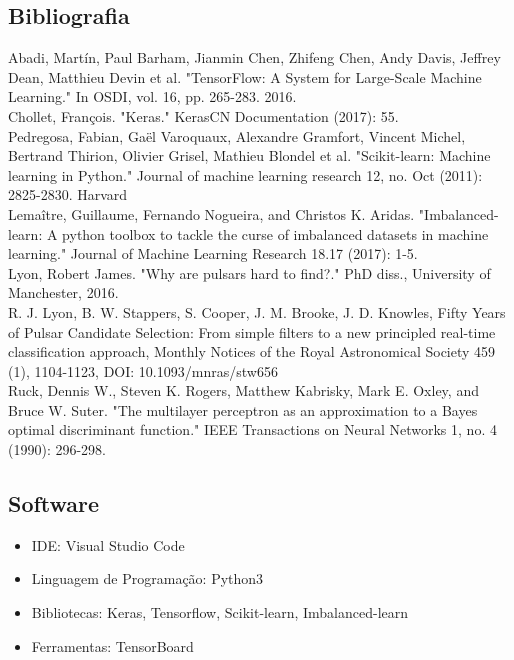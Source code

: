 \documentclass[]{article}
\begin{document}
\subsection{Bibliografia}

Abadi, Martín, Paul Barham, Jianmin Chen, Zhifeng Chen, Andy Davis, Jeffrey Dean, Matthieu Devin et al. "TensorFlow: A System for Large-Scale Machine Learning." In OSDI, vol. 16, pp. 265-283. 2016.
\\

Chollet, François. "Keras." KerasCN Documentation (2017): 55.
\\

Pedregosa, Fabian, Gaël Varoquaux, Alexandre Gramfort, Vincent Michel, Bertrand Thirion, Olivier Grisel, Mathieu Blondel et al. "Scikit-learn: Machine learning in Python." Journal of machine learning research 12, no. Oct (2011): 2825-2830.
Harvard	
\\

Lemaître, Guillaume, Fernando Nogueira, and Christos K. Aridas. "Imbalanced-learn: A python toolbox to tackle the curse of imbalanced datasets in machine learning." Journal of Machine Learning Research 18.17 (2017): 1-5.
\\

Lyon, Robert James. "Why are pulsars hard to find?." PhD diss., University of Manchester, 2016.
\\

R. J. Lyon, B. W. Stappers, S. Cooper, J. M. Brooke, J. D. Knowles, Fifty Years of Pulsar Candidate Selection: From simple filters to a new principled real-time classification approach, Monthly Notices of the Royal Astronomical Society 459 (1), 1104-1123, DOI: 10.1093/mnras/stw656
\\

Ruck, Dennis W., Steven K. Rogers, Matthew Kabrisky, Mark E. Oxley, and Bruce W. Suter. "The multilayer perceptron as an approximation to a Bayes optimal discriminant function." IEEE Transactions on Neural Networks 1, no. 4 (1990): 296-298.
\\

\subsection{Software}
\label{sec:software}
\begin{itemize}
  \item IDE: Visual Studio Code
  \item Linguagem de Programação: Python3
  \item Bibliotecas: Keras, Tensorflow, Scikit-learn, Imbalanced-learn
  \item Ferramentas: TensorBoard
\end{itemize}
\end{document}
